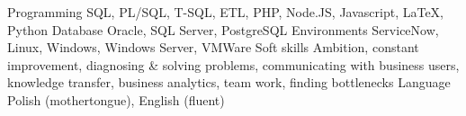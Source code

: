 \begin{cvskills}
  \cvskill
    {Programming} %
    {SQL, PL/SQL, T-SQL, ETL, PHP, Node.JS, Javascript, \LaTeX, Python} %
  \cvskill
    {Database} %
    {Oracle, SQL Server, PostgreSQL} %
  \cvskill
    {Environments} %
    {ServiceNow, Linux, Windows, Windows Server, VMWare} %
  \cvskill
    {Soft skills} %
    {Ambition, constant improvement, diagnosing \& solving problems, communicating with business users, knowledge transfer, business analytics, team work, finding bottlenecks} %
  \cvskill
  	{Language}
  	{Polish (mothertongue), English (fluent)}
\end{cvskills}
